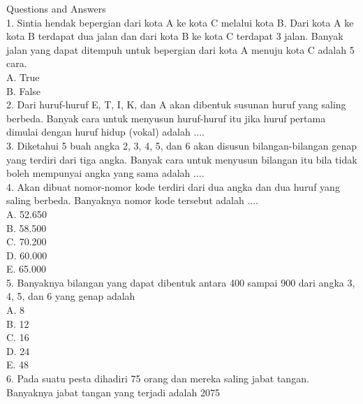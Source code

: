 \documentclass[11pt,fleqn]{book} %
\begin{document}
Questions and Answers\\




1. 
Sintia hendak bepergian dari kota A ke kota C melalui kota B. Dari kota A ke kota B terdapat dua jalan dan dari kota B ke kota C terdapat 3 jalan. Banyak jalan yang dapat ditempuh untuk bepergian dari kota A menuju kota C adalah 5 cara.\\

A. 
True\\

B. 
False\\

2. 
Dari huruf-huruf E, T, I, K, dan A akan dibentuk susunan huruf yang saling berbeda. Banyak cara untuk menyusun huruf-huruf itu jika huruf pertama dimulai dengan huruf hidup (vokal) adalah ....\\

3. 
Diketahui 5 buah angka 2, 3, 4, 5, dan 6 akan disusun bilangan-bilangan genap yang terdiri dari tiga angka. Banyak cara untuk menyusun bilangan itu bila tidak boleh mempunyai angka yang sama adalah ....\\

4. 
Akan dibuat nomor-nomor kode terdiri dari dua angka dan dua huruf yang saling berbeda. Banyaknya nomor kode tersebut adalah ....\\

A. 
52.650\\

B. 
58.500\\

C. 
70.200\\

D. 
60.000\\

E. 
65.000\\

5. 
Banyaknya bilangan yang dapat dibentuk antara 400 sampai 900 dari angka 3, 4, 5, dan 6 yang genap adalah\\

A. 
8\\

B. 
12\\

C. 
16\\

D. 
24\\

E. 
48\\

6. 
Pada suatu pesta dihadiri 75 orang dan mereka saling jabat tangan. Banyaknya jabat tangan yang terjadi adalah 2075\\
\end{document}
